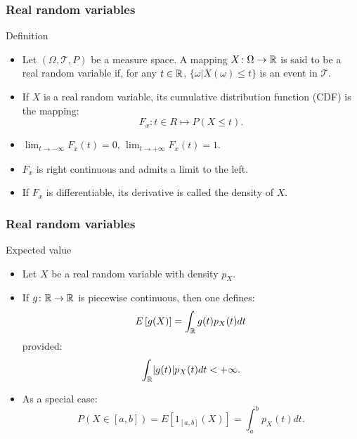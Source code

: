 \begin{frame}
    \frametitle{Real random variables}
\begin{block}{Definition}
    \begin{itemize}
    \item<+-> Let $\left( \Omega, \mathcal{T}, P \right)$ be a measure space. A mapping $X \colon \Omega \to \mathbb{R}$ is
    said to be a real random variable if, for any $t \in \mathbb{R}$, $\{ \omega \vert X(\omega) \leq t \}$ is an event in $\mathcal{T}.$
    \item<+-> If $X$ is a real random variable, its cumulative distribution function (CDF) is the mapping:
    \begin{equation}
        F_x \colon t \in R \mapsto P\left( X \leq t \right).
    \end{equation}
    \item<+-> $\lim_{t \to -\infty}F_x(t) = 0, \, \lim_{t \to +\infty} F_x(t)=1.$
    \item<+-> $F_x$ is right continuous and admits a limit to the left.
    \item<+-> If $F_x$ is differentiable, its derivative is called the density of $X$.
    \end{itemize}
\end{block}
\end{frame}
\begin{frame}
    \frametitle{Real random variables}
\begin{block}{Expected value}
    \begin{itemize}
    \item<+-> Let $X$ be a real random variable with density $p_X$. 
    \item<+-> If $g \colon \mathbb{R} \to \mathbb{R}$ is piecewise continuous, then one defines:
    \begin{equation}
        E\left[ g(X) \right] = \int_{\mathbb{R}} g(t) p_X(t) dt
    \end{equation} 
    provided:
\begin{equation}
    \int_{\mathbb{R}} \lvert g(t) \rvert p_X(t) dt < +\infty.
\end{equation}
    \item<+-> As a special case:
    \begin{equation}
        P\left( X \in [a,b] \right) = E \left[ 1_{[a,b]}(X) \right] = \int_a^b p_X(t) dt.
    \end{equation}
\end{itemize}
\end{block}
    

\end{frame}